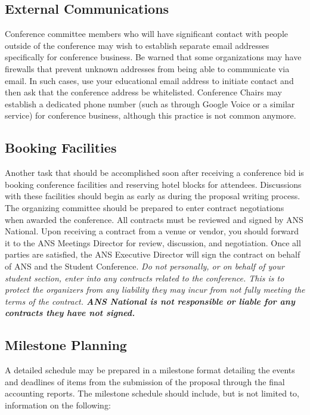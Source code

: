 \documentclass[12pt]{article}
\begin{document}
\subsection{External Communications}
Conference committee members who will have significant contact with people outside of the conference may wish to establish separate email addresses specifically for conference business.
Be warned that some organizations may have firewalls that prevent unknown addresses from being able to communicate via email.
In such cases, use your educational email address to initiate contact and then ask that the conference address be whitelisted.
Conference Chairs may establish a dedicated phone number (such as through Google Voice or a similar service) for conference business, although this practice is not common anymore.

\subsection{Booking Facilities}

Another task that should be accomplished soon after receiving a conference bid is booking conference facilities and reserving hotel blocks for attendees.
Discussions with these facilities should begin as early as during the proposal writing process.
The organizing committee should be prepared to enter contract negotiations when awarded the conference.
All contracts must be reviewed and signed by ANS National.
Upon receiving a contract from a venue or vendor, you should forward it to the ANS Meetings Director for review, discussion, and negotiation.
Once all parties are satisfied, the ANS Executive Director will sign the contract on behalf of ANS and the Student Conference.
\emph{Do not personally, or on behalf of your student section, enter into any contracts related to the conference.
This is to protect the organizers from any liability they may incur from not fully meeting the terms of the contract.
\textbf{ANS National is not responsible or liable for any contracts they have not signed.}}

\subsection{Milestone Planning}
A detailed schedule may be prepared in a milestone format detailing the events and deadlines of items from the submission of the proposal through the final accounting reports.
The milestone schedule should include, but is not limited to, information on the following:
\end{document}
